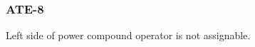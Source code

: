 \newpage
\subsubsection{ATE-8}\label{sec:error_code_ate_8}

Left side of power compound operator is not assignable.


